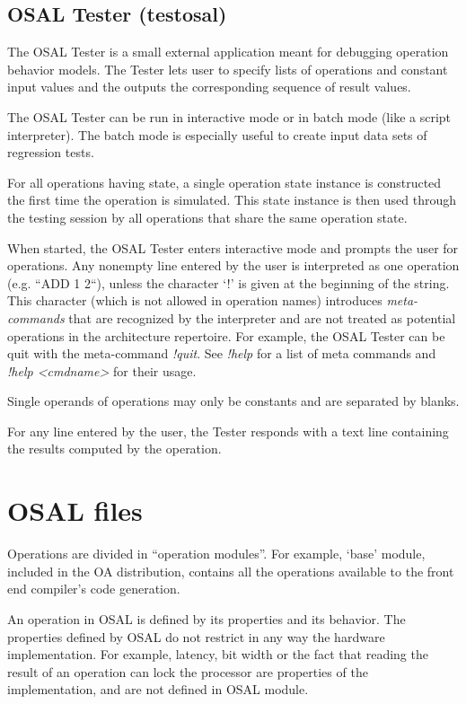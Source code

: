 \documentclass[a4paper,twoside]{tceusermanual}
\begin{document}
\subsection{OSAL Tester (testosal)}
\label{sec:testosal}

The OSAL Tester is a small external application meant for debugging 
operation behavior models.  The Tester lets user to specify lists of
operations and constant input values and the outputs the corresponding sequence
of result values.

The OSAL Tester can be run in interactive mode or in batch mode (like a
script interpreter).  The batch mode is especially useful to create input
data sets of regression tests.

For all operations having state, a single operation state instance is
constructed the first time the operation is simulated. This state instance
is then used through the testing session by all operations that share the
same operation state.

When started, the OSAL Tester enters interactive mode and prompts the user
for operations. Any nonempty line entered by the user is interpreted as one
operation (e.g. ``ADD 1 2``), unless the character `!' is given at the beginning of 
the string. This character (which is not allowed in operation names) introduces
\emph{meta-commands} that are recognized by the interpreter and are not
treated as potential operations in the architecture repertoire. For example, the
OSAL Tester can be quit with the meta-command \textit{!quit}. See \textit{!help}
for a list of meta commands and \textit{!help <cmdname>} for their usage.

Single operands of operations may only be constants and are separated by
blanks.

For any line entered by the user, the Tester responds with a text line
containing the results computed by the operation.


\section{OSAL files}
\label{section:osal_details}
Operations are divided in ``operation modules''. For example, `base' module,
included in the OA distribution, contains all the operations available 
to the front end compiler's code generation.

An operation in OSAL is defined by its properties
and its behavior.  The properties defined by OSAL do not restrict in any
way the hardware implementation.  For example, latency, bit width or the
fact that reading the result of an operation can lock the processor are
properties of the implementation, and are not defined in OSAL module.
\end{document}
